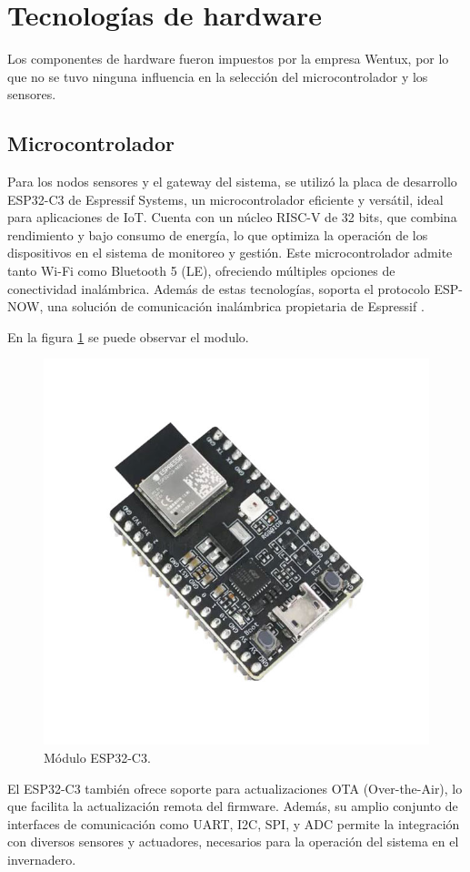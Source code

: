\section{Tecnologías de hardware}

Los componentes de hardware fueron impuestos por la empresa Wentux, por lo que no se tuvo ninguna influencia en la selección del microcontrolador y los sensores.

\subsection{Microcontrolador}

Para los nodos sensores y el gateway del sistema, se utilizó la placa de desarrollo ESP32-C3 de Espressif Systems, un microcontrolador eficiente y versátil, ideal para aplicaciones de IoT. Cuenta con un núcleo RISC-V de 32 bits, que combina rendimiento y bajo consumo de energía, lo que optimiza la operación de los dispositivos en el sistema de monitoreo y gestión.
Este microcontrolador admite tanto Wi-Fi como Bluetooth 5 (LE), ofreciendo múltiples opciones de conectividad inalámbrica. Además de estas tecnologías, soporta el protocolo ESP-NOW, una solución de comunicación inalámbrica propietaria de Espressif \citep{esp32c3}.

En la figura \ref{fig:esp32c3} se puede observar el modulo.

\begin{figure}[htpb]
    \centering
    \includegraphics[width=.3\textwidth]{./Figures/esp32c3.png}
    \caption{Módulo ESP32-C3.}
    \label{fig:esp32c3}
\end{figure}

El ESP32-C3 también ofrece soporte para actualizaciones OTA (Over-the-Air), lo que facilita la actualización remota del firmware. Además, su amplio conjunto de interfaces de comunicación como UART, I2C, SPI, y ADC permite la integración con diversos sensores y actuadores, necesarios para la operación del sistema en el invernadero. 

